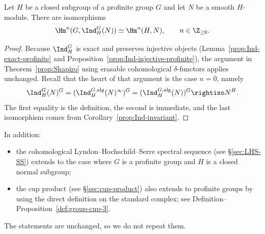 \begin{proposition}
	Let $H$ be a closed subgroup of a profinite group $G$ and let $N$ be a
	smooth $H$-module. There are isomorphisms
	\[ \Hm^n(G,\Ind^G_H(N))\simeq\Hm^n(H,N),
	\qquad n\in\Z_{\geq0}. \]
\end{proposition}
\begin{proof}
	Because $\Ind^G_H$ is exact and preserves injective objects
	(Lemma~\ref{prop:Ind-exact-profinite} and
	Proposition~\ref{prop:Ind-injective-profinite}), the argument in
	Theorem~\ref{prop:Shapiro} using erasable cohomological $\delta$-functors
	applies unchanged. Recall that the heart of that argument is the case
	$n=0$, namely
	\[ \Ind^G_H(N)^G
	=(\Ind^{G,\mathrm{alg}}_H(N)^\infty)^G
	=(\Ind^{G,\mathrm{alg}}_H(N))^G\rightiso N^H. \]
	The first equality is the definition, the second is immediate, and the
	last isomorphism comes from Corollary~\ref{prop:Ind-invariant}.
\end{proof}

In addition:
\begin{itemize}
	\item the cohomological Lyndon--Hochschild--Serre spectral sequence
	(see \S\ref{sec:LHS-SS}) extends to the case where $G$ is a profinite
	group and $H$ is a closed normal subgroup;
	\item the cup product (see \S\ref{sec:cup-product}) also extends to
	profinite groups by using the direct definition on the standard complex;
	see Definition--Proposition~\ref{def:group-cup-3}.
\end{itemize}
The statements are unchanged, so we do not repeat them.
